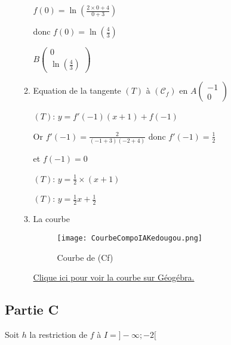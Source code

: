 \documentclass[12pt,a4paper]{article}
\begin{document}
\begin{enumerate}
\begin{enumerate}
    \( f(0) = \ln\left( \frac{2 \times 0+4}{0+3} \right) \)

donc \( f(0) = \ln\left( \frac{4}{3} \right) \)

$ B \begin{pmatrix} 0 \\ \ln\left( \frac{4}{3} \right) \end{pmatrix} $

\item Equation de la tangente \( (T) \) à \( (\mathcal{C}_{f}) \) en \( A\begin{pmatrix} -1 \\ 0 \end{pmatrix} \)

\( (T) \): \( y = f'(-1) (x+1)  + f(-1) \)

Or \( f'(-1) = \frac{2}{(-1+3)(-2+4)} \) donc \( f'(-1) = \frac{1}{2} \)

et \( f(-1) = 0 \)

\( (T) \): \( y = \frac{1}{2} \times (x+1) \)

\( (T) \): \( y = \frac{1}{2}x+\frac{1}{2} \)
\item La courbe 


\begin{figure}[H] %
    \centering
    \texttt{[image: CourbeCompoIAKedougou.png]}
    \caption{Courbe de (Cf)}
    \label{fig:monimage}
\end{figure}

\noindent
\href{https://www.geogebra.org/classic/ud3zvetx}{Clique ici pour voir la courbe sur Géogébra.}

\end{enumerate}

\end{enumerate}

\subsection*{Partie C}

Soit \( h \) la restriction de \( f \) à \( I = ]-\infty; -2 [ \)
\end{document}
